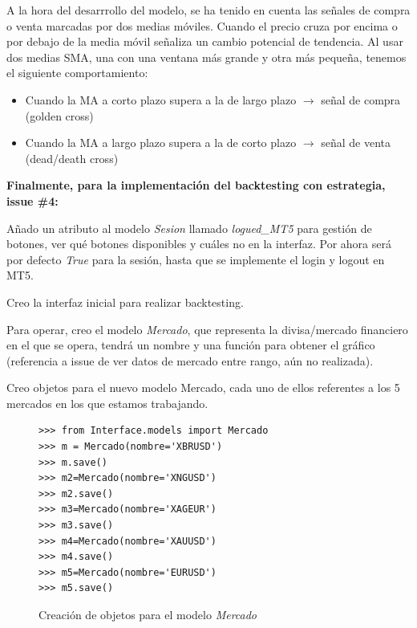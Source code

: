 A la hora del desarrrollo del modelo, se ha tenido en cuenta las señales de compra o venta marcadas por dos medias móviles. Cuando el precio cruza por encima o por debajo de la media móvil señaliza un cambio potencial de tendencia. Al usar dos medias SMA, una con una ventana más grande y otra más pequeña, tenemos el siguiente comportamiento: 

\begin{itemize}
	\item Cuando la MA a corto plazo supera a la de largo plazo $\rightarrow$ señal de compra (golden cross)
	\item Cuando la MA a largo plazo supera a la de corto plazo $\rightarrow$ señal de venta (dead/death cross)
\end{itemize}

\textbf{Finalmente, para la implementación del backtesting con estrategia, issue \#4:}\newline

Añado un atributo al modelo \textit{Sesion} llamado \textit{logued\_MT5} para gestión de botones, ver qué botones disponibles y cuáles no en la interfaz. Por ahora será por defecto \textit{True} para la sesión, hasta que se implemente el login y logout en MT5. \newline

Creo la interfaz inicial para realizar backtesting. \newline

Para operar, creo el modelo \textit{Mercado}, que representa la divisa/mercado financiero en el que se opera, tendrá un nombre y una función para obtener el gráfico (referencia a issue de ver datos de mercado entre rango, aún no realizada). \newline

Creo objetos para el nuevo modelo Mercado, cada uno de ellos referentes a los 5 mercados en los que estamos trabajando.\newline

\begin{figure}[!h]
\begin{lstlisting}
>>> from Interface.models import Mercado
>>> m = Mercado(nombre='XBRUSD')
>>> m.save()
>>> m2=Mercado(nombre='XNGUSD')
>>> m2.save()
>>> m3=Mercado(nombre='XAGEUR')
>>> m3.save()
>>> m4=Mercado(nombre='XAUUSD')
>>> m4.save()
>>> m5=Mercado(nombre='EURUSD')
>>> m5.save()
\end{lstlisting}
\caption{Creación de objetos para el modelo \textit{Mercado}}
\end{figure}


